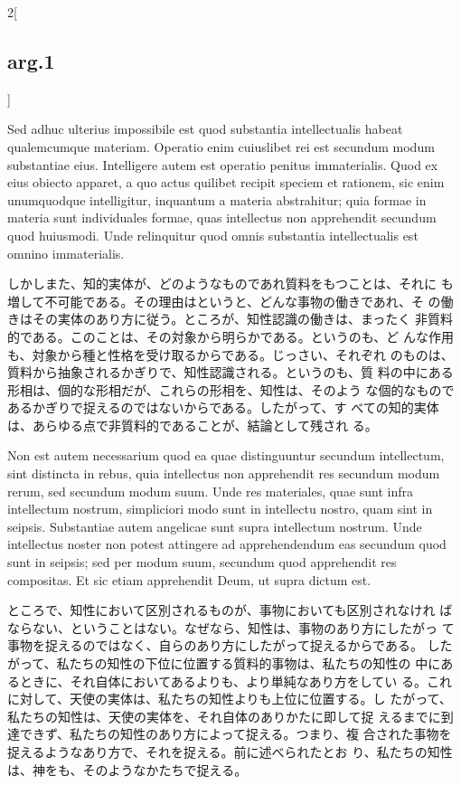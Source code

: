 \documentclass[paper=a4paper,fontsize=10pt,jafontsize=9pt,titlepage]{jlreq}
\begin{document}
\begin{paracol}{2}[\subsection{arg.1}]
\switchcolumn*

Sed adhuc ulterius impossibile est quod substantia intellectualis
 habeat qualemcumque materiam. Operatio enim cuiuslibet rei est
 secundum modum substantiae eius. Intelligere autem est operatio
 penitus immaterialis. Quod ex eius obiecto apparet, a quo actus
 quilibet recipit speciem et rationem, sic enim unumquodque
 intelligitur, inquantum a materia abstrahitur; quia formae in materia
 sunt individuales formae, quas intellectus non apprehendit secundum
 quod huiusmodi. Unde relinquitur quod omnis substantia intellectualis
 est omnino immaterialis.

\switchcolumn

しかしまた、知的実体が、どのようなものであれ質料をもつことは、それに
 も増して不可能である。その理由はというと、どんな事物の働きであれ、そ
 の働きはその実体のあり方に従う。ところが、知性認識の働きは、まったく
 非質料的である。このことは、その対象から明らかである。というのも、ど
 んな作用も、対象から種と性格を受け取るからである。じっさい、それぞれ
 のものは、質料から抽象されるかぎりで、知性認識される。というのも、質
 料の中にある形相は、個的な形相だが、これらの形相を、知性は、そのよう
 な個的なものであるかぎりで捉えるのではないからである。したがって、す
 べての知的実体は、あらゆる点で非質料的であることが、結論として残され
 る。

\switchcolumn*

Non est autem necessarium quod ea quae distinguuntur secundum
 intellectum, sint distincta in rebus, quia intellectus non
 apprehendit res secundum modum rerum, sed secundum modum suum. Unde
 res materiales, quae sunt infra intellectum nostrum, simpliciori modo
 sunt in intellectu nostro, quam sint in seipsis. Substantiae autem
 angelicae sunt supra intellectum nostrum. Unde intellectus noster non
 potest attingere ad apprehendendum eas secundum quod sunt in seipsis;
 sed per modum suum, secundum quod apprehendit res compositas. Et sic
 etiam apprehendit Deum, ut supra dictum est.

\switchcolumn

ところで、知性において区別されるものが、事物においても区別されなけれ
 ばならない、ということはない。なぜなら、知性は、事物のあり方にしたがっ
 て事物を捉えるのではなく、自らのあり方にしたがって捉えるからである。
 したがって、私たちの知性の下位に位置する質料的事物は、私たちの知性の
 中にあるときに、それ自体においてあるよりも、より単純なあり方をしてい
 る。これに対して、天使の実体は、私たちの知性よりも上位に位置する。し
 たがって、私たちの知性は、天使の実体を、それ自体のありかたに即して捉
 えるまでに到達できず、私たちの知性のあり方によって捉える。つまり、複
 合された事物を捉えるようなあり方で、それを捉える。前に述べられたとお
 り、私たちの知性は、神をも、そのようなかたちで捉える。


\end{paracol}
\end{document}

